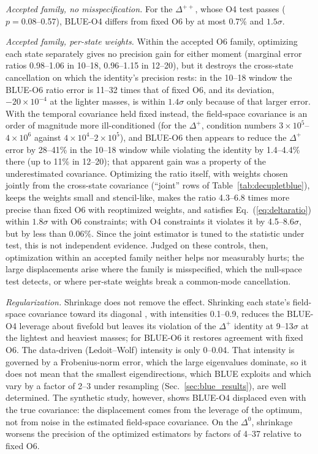 \documentclass[aps,prd,preprint,nofootinbib,floatfix]{revtex4-2}
\begin{document}
\emph{Accepted family, no misspecification.} For the $\Delta^{++}$, whose O4 test passes ($p=0.08$--0.57), BLUE-O4 differs from fixed O6 by at most 0.7\% and $1.5\sigma$.

\emph{Accepted family, per-state weights.} Within the accepted O6 family, optimizing each state separately gives no precision gain for either moment (marginal error ratios 0.98--1.06 in 10--18, 0.96--1.15 in 12--20), but it destroys the cross-state cancellation on which the identity's precision rests: in the 10--18 window the BLUE-O6 ratio error is 11--32 times that of fixed O6, and its deviation, $-20\times10^{-4}$ at the lighter masses, is within $1.4\sigma$ only because of that larger error. With the temporal covariance held fixed instead, the field-space covariance is an order of magnitude more ill-conditioned (for the $\Delta^+$, condition numbers $3\times10^5$--$4\times10^6$ against $4\times10^4$--$2\times10^5$), and BLUE-O6 then appears to reduce the $\Delta^+$ error by 28--41\% in the 10--18 window while violating the identity by 1.4--4.4\% there (up to 11\% in 12--20); that apparent gain was a property of the underestimated covariance. Optimizing the ratio itself, with weights chosen jointly from the cross-state covariance (``joint'' rows of Table~\ref{tab:decupletblue}), keeps the weights small and stencil-like, makes the ratio 4.3--6.8 times more precise than fixed O6 with reoptimized weights, and satisfies Eq.~(\ref{eq:deltaratio}) within $1.8\sigma$ with O6 constraints; with O4 constraints it violates it by 4.5--8.6$\sigma$, but by less than 0.06\%. Since the joint estimator is tuned to the statistic under test, this is not independent evidence. Judged on these controls, then, optimization within an accepted family neither helps nor measurably hurts; the large displacements arise where the family is misspecified, which the null-space test detects, or where per-state weights break a common-mode cancellation.

\emph{Regularization.} Shrinkage does not remove the effect. Shrinking each state's field-space covariance toward its diagonal \cite{LedoitWolf2004}, with intensities 0.1--0.9, reduces the BLUE-O4 leverage about fivefold but leaves its violation of the $\Delta^+$ identity at 9--13$\sigma$ at the lightest and heaviest masses; for BLUE-O6 it restores agreement with fixed O6. The data-driven (Ledoit--Wolf) intensity is only 0--0.04. That intensity is governed by a Frobenius-norm error, which the large eigenvalues dominate, so it does not mean that the smallest eigendirections, which BLUE exploits and which vary by a factor of 2--3 under resampling (Sec.~\ref{sec:blue_results}), are well determined. The synthetic study, however, shows BLUE-O4 displaced even with the true covariance: the displacement comes from the leverage of the optimum, not from noise in the estimated field-space covariance. On the $\Delta^0$, shrinkage worsens the precision of the optimized estimators by factors of 4--37 relative to fixed O6.
\end{document}
